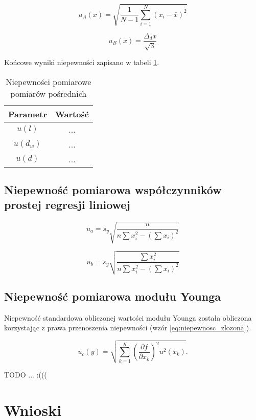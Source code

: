 \documentclass[a4paper,12pt]{article}
\begin{document}
\begin{equation}
\label{eq:u_A}
u_A(x) = \sqrt{\frac{1}{N-1} \sum_{i=1}^{N} (x_i - \bar{x})^2}
\end{equation}

\begin{equation}
\label{eq:u_B}
u_B(x) = \frac{\Delta_d x}{\sqrt{3}}
\end{equation}


Końcowe wyniki niepewności zapisano w tabeli \ref{tab:niepewnosci_1}.

\begin{table}[H]
    \centering
    \begin{tabular}{c|c}
        Parametr & Warto\'s\'c  \\
        \hline
        $u(l)$ & ... \\
        $u(d_w)$ & ... \\
        $u(d)$ & ... \\
    \end{tabular}
    \caption{Niepewności pomiarowe pomiarów pośrednich}
    \label{tab:niepewnosci_1}
\end{table}

\subsection{Niepewność pomiarowa współczynników prostej regresji liniowej}

\[
u_a = s_y \sqrt{\frac{n}{n \sum x_i^2 - \left( \sum x_i \right)^2}}
\]

\[
u_b = s_y \sqrt{\frac{\sum x_i^2}{n \sum x_i^2 - \left( \sum x_i \right)^2}}
\]

\subsection{Niepewność pomiarowa modułu Younga}

Niepewność standardowa obliczonej wartości modułu Younga została obliczona korzystając z prawa przenoszenia niepewności (wzór \ref{eq:niepewnosc_zlozona}).

\begin{equation}
\label{eq:niepewnosc_zlozona}
    u_c(y) = \sqrt{\sum_{k=1}^{K} \left( \frac{\partial f}{\partial x_k} \right)^2 u^2(x_k)}.
\end{equation}

TODO
...
:(((

\section{Wnioski}
\end{document}
